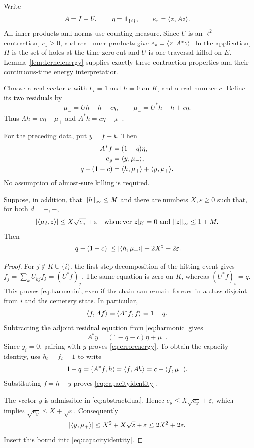 Write
\[
 A=I-U,\qquad \eta=\mathbf 1_{\{i\}},\qquad
 e_z=\langle z,Az\rangle.
\]
All inner products and norms use counting measure.  Since $U$ is an
$\ell^2$ contraction, $e_z\ge0$, and real inner products give
$e_z=\langle z,A^*z\rangle$.  In the application, $H$ is the set of holes at
the time-zero cut and $U$ is one traversal killed on $E$.
Lemma~\ref{lem:kernelenergy} supplies exactly these contraction
properties and their continuous-time energy interpretation.

Choose a real vector $h$ with $h_i=1$ and $h=0$ on $K$, and a real
number $c$.  Define its two residuals by
\begin{equation}\label{eq:capacityresiduals}
 \mu_+=Uh-h+c\eta,\qquad
 \mu_-=U^*h-h+c\eta.
\end{equation}
Thus $Ah=c\eta-\mu_+$ and $A^*h=c\eta-\mu_-$.

\begin{lemma}\label{lem:capacity}
For the preceding data, put $y=f-h$.  Then
\begin{align}
 A^*f&=(1-q)\eta,                                      \label{eq:harmonic}\\
 e_y&=\langle y,\mu_-\rangle,                                  \label{eq:errorenergy}\\
 q-(1-c)
 &=\langle h,\mu_+\rangle+\langle y,\mu_+\rangle.                     \label{eq:capacityidentity}
\end{align}
No assumption of almost-sure killing is required.

Suppose, in addition, that $\lVert h\rVert_\infty\le M$ and there are
numbers $X,\varepsilon\ge0$ such that, for both $d=+,-$,
\begin{equation}\label{eq:abstractdual}
 \lvert \langle \mu_d,z\rangle\rvert\le X\sqrt{e_z}+\varepsilon
 \quad\text{whenever }z|_K=0\text{ and }\lVert z\rVert_\infty\le1+M.
\end{equation}
Then
\begin{equation}\label{eq:capacitystability}
 \lvert q-(1-c)\rvert
 \le \lvert \langle h,\mu_+\rangle\rvert+2X^2+2\varepsilon.
\end{equation}
\end{lemma}

\begin{proof}
For $j\notin K\cup\{i\}$, the first-step decomposition of the
hitting event gives $f_j=\sum_kU_{kj}f_k=(U^*f)_j$.
The same equation is zero on $K$, whereas $(U^*f)_i=q$.
This proves \eqref{eq:harmonic}, even if the chain can remain forever
in a class disjoint from $i$ and the cemetery state.
In particular,
\[
 \langle f,Af\rangle=\langle A^*f,f\rangle=1-q.
\]
Subtracting the adjoint residual equation from
\eqref{eq:harmonic} gives
\[
 A^*y=(1-q-c)\eta+\mu_-.
\]
Since $y_i=0$, pairing with $y$ proves \eqref{eq:errorenergy}.
To obtain the capacity identity, use $h_i=f_i=1$ to write
\[
 1-q=\langle A^*f,h\rangle=\langle f,Ah\rangle
     =c-\langle f,\mu_+\rangle.
\]
Substituting $f=h+y$ proves \eqref{eq:capacityidentity}.

The vector $y$ is admissible in \eqref{eq:abstractdual}.
Hence $e_y\le X\sqrt{e_y}+\varepsilon$, which implies
$\sqrt{e_y}\le X+\sqrt\varepsilon$.  Consequently
\[
 \lvert \langle y,\mu_+\rangle\rvert
 \le X^2+X\sqrt\varepsilon+\varepsilon
 \le2X^2+2\varepsilon.
\]
Insert this bound into \eqref{eq:capacityidentity}.
\end{proof}

